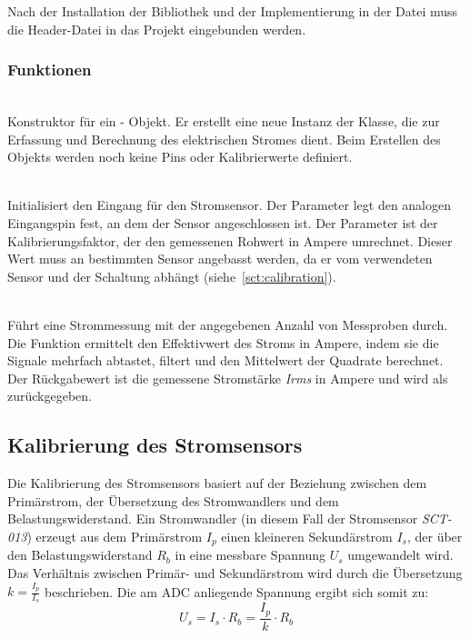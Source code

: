 	Nach der Installation der Bibliothek und der Implementierung in der Datei  muss die Header-Datei  in das Projekt eingebunden werden.


	\subsubsection{Funktionen}
		\begin{description}
		\item {} \\ 
		Konstruktor für ein  - Objekt.  Er erstellt eine neue Instanz der Klasse, die zur Erfassung und Berechnung des elektrischen Stromes dient. Beim Erstellen des Objekts werden noch keine Pins oder Kalibrierwerte definiert.
		
		
		\item {} \\ 
		Initialisiert den Eingang für den Stromsensor. 
		Der Parameter  legt den analogen Eingangspin fest, an dem der Sensor angeschlossen ist. 
		Der Parameter  ist der Kalibrierungsfaktor, der den gemessenen Rohwert in Ampere umrechnet. 
		Dieser Wert muss an bestimmten Sensor angebasst werden, da er vom verwendeten Sensor und der Schaltung abhängt (siehe~\autoref{sct:calibration}).
		
		
		\item {} \\ 
		 Führt eine Strommessung mit der angegebenen Anzahl von Messproben durch. Die Funktion ermittelt den Effektivwert des Stroms in Ampere, indem sie die Signale mehrfach abtastet, filtert und den Mittelwert der Quadrate berechnet. Der Rückgabewert ist die gemessene Stromstärke \textit{Irms} in Ampere und wird als  zurückgegeben.
		
	\end{description}
		
	\subsection{Kalibrierung des Stromsensors \label{sct:calibration}}
	
	Die Kalibrierung des Stromsensors basiert auf der Beziehung zwischen dem Primärstrom, der Übersetzung des Stromwandlers und dem Belastungswiderstand. 
	Ein Stromwandler (in diesem Fall der Stromsensor \textit{SCT-013}) erzeugt aus dem Primärstrom \(I_p\) einen kleineren Sekundärstrom \(I_s\), der über den Belastungswiderstand \(R_b\) in eine messbare Spannung \(U_s\) umgewandelt wird. 
	Das Verhältnis zwischen Primär- und Sekundärstrom wird durch die Übersetzung \(k = \frac{I_p}{I_s}\) beschrieben. 
	Die am ADC anliegende Spannung ergibt sich somit zu:
	\[
	U_s = I_s \cdot R_b = \frac{I_p}{k} \cdot R_b
	\]
	
